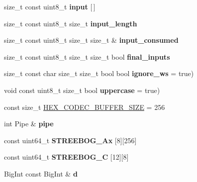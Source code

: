 \begin{DoxyCompactItemize}
size\+\_\+t const uint8\+\_\+t {\bfseries input} \mbox{[}$\,$\mbox{]}
\item 
\mbox{\label{namespace_botan_a257a507d4f39f711164d0034eb76e3fc}} 
size\+\_\+t const uint8\+\_\+t size\+\_\+t {\bfseries input\+\_\+length}
\item 
\mbox{\label{namespace_botan_a557affd0df05877203fcde9e879430e0}} 
size\+\_\+t const uint8\+\_\+t size\+\_\+t size\+\_\+t \& {\bfseries input\+\_\+consumed}
\item 
\mbox{\label{namespace_botan_a359a4639d84ac68c8ba18fa1205285fa}} 
size\+\_\+t const uint8\+\_\+t size\+\_\+t size\+\_\+t bool {\bfseries final\+\_\+inputs}
\item 
\mbox{\label{namespace_botan_a98cc94b58e3ee6419d77259d708116df}} 
size\+\_\+t const char size\+\_\+t size\+\_\+t bool bool {\bfseries ignore\+\_\+ws} = true)
\item 
\mbox{\label{namespace_botan_a42a3f342c74ac8f571459d0ca7056806}} 
void const uint8\+\_\+t size\+\_\+t bool {\bfseries uppercase} = true)
\item 
const size\+\_\+t \mbox{\hyperlink{namespace_botan_a74718b9df0b68e9b2d04755c39d3b55d}{H\+E\+X\+\_\+\+C\+O\+D\+E\+C\+\_\+\+B\+U\+F\+F\+E\+R\+\_\+\+S\+I\+ZE}} = 256
\item 
\mbox{\label{namespace_botan_abcfcbc6518be802679615ad5f56f0874}} 
int Pipe \& {\bfseries pipe}
\item 
\mbox{\label{namespace_botan_acd045a3bc66c6a1ed43fcee59e982a8b}} 
const uint64\+\_\+t {\bfseries S\+T\+R\+E\+E\+B\+O\+G\+\_\+\+Ax} \mbox{[}8\mbox{]}\mbox{[}256\mbox{]}
\item 
\mbox{\label{namespace_botan_a482cd2fbd9380730cd034d1843d11197}} 
const uint64\+\_\+t {\bfseries S\+T\+R\+E\+E\+B\+O\+G\+\_\+C} \mbox{[}12\mbox{]}\mbox{[}8\mbox{]}
\item 
\mbox{\label{namespace_botan_a273d9afd937ccb083af5cc0b8b375bdf}} 
Big\+Int const Big\+Int \& {\bfseries d}
\item 
\mbox{\label{namespace_botan_af405c5775a4542d37f7f3f532735d18f}} 

\end{DoxyCompactItemize}
